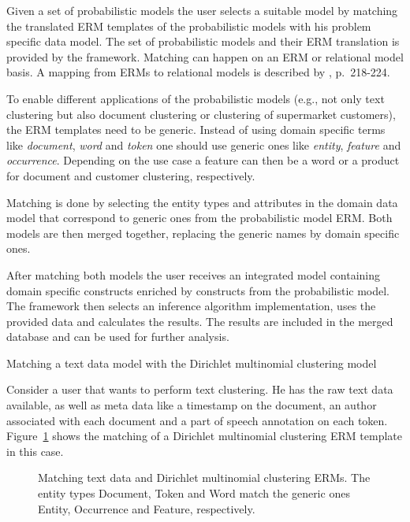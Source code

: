 Given a set of probabilistic models the user selects a suitable model by matching the translated ERM templates of the probabilistic models with his problem specific data model. The set of probabilistic models and their ERM translation is provided by the framework. Matching can happen on an ERM or relational model basis. A mapping from ERMs to relational models is described by \textcite{elmasri2007database}, p.~218-224.

To enable different applications of the probabilistic models (e.g., not only text clustering but also document clustering or clustering of supermarket customers), the ERM templates need to be generic. Instead of using domain specific terms like \emph{document}, \emph{word} and \emph{token} one should use generic ones like \emph{entity}, \emph{feature} and \emph{occurrence}. Depending on the use case a feature can then be a word or a product for document and customer clustering, respectively.

Matching is done by selecting the entity types and attributes in the domain data model that correspond to generic ones from the probabilistic model ERM. Both models are then merged together, replacing the generic names by domain specific ones.

After matching both models the user receives an integrated model containing domain specific constructs enriched by constructs from the probabilistic model. The framework then selects an inference algorithm implementation, uses the provided data and calculates the results. The results are included in the merged database and can be used for further analysis.

\begin{Example} Matching a text data model with the Dirichlet multinomial clustering model

Consider a user that wants to perform text clustering. He has the raw text data available, as well as meta data like a timestamp on the document, an author associated with each document and a part of speech annotation on each token. Figure~\ref{fig:matching_clustering} shows the matching of a Dirichlet multinomial clustering ERM template in this case.

\vspace*{1em}
\begin{figure}[h!]
\centering
\scalebox{0.5}{\adjustTikzSize }
\caption[Matching text data and Dirichlet multinomial clustering ERM]{Matching text data and Dirichlet multinomial clustering ERMs. The entity types Document, Token and Word match the generic ones Entity, Occurrence and Feature, respectively.}\label{fig:matching_clustering}
\end{figure}

\end{Example}
